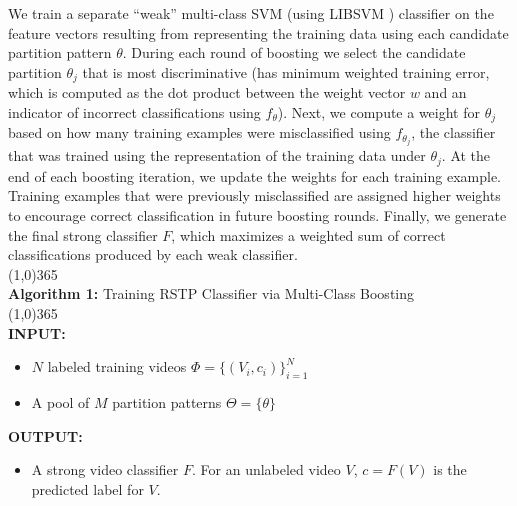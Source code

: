 \documentclass{bmvc2k}
\begin{document}
  We train a separate ``weak''
  multi-class SVM 
  (using LIBSVM \cite{Chang11})
	classifier on the feature vectors resulting from representing the training
	data using each candidate partition pattern $\theta$.   During each round of boosting we select the
	candidate partition $\theta_j$ that is most discriminative (has minimum
  weighted training
	error, which is computed as the dot product between the weight vector $w$
  and an indicator of incorrect classifications using $f_\theta$).
  Next, we compute a weight for $\theta_j$ based on how many training
  examples were misclassified using $f_{\theta_j}$, the classifier
  that was trained using the representation of the training data under
  $\theta_j$.
  At the end of each boosting iteration, we update the weights for each
  training example. Training examples that were previously misclassified are
  assigned higher weights to encourage correct classification in future
  boosting rounds.
  Finally, we generate the 
	final strong classifier $F$, which maximizes a weighted
  sum of correct classifications produced by each weak classifier.\\
  \footnotesize
  \line(1,0){365}\\
	\noindent\textbf{Algorithm 1:} Training RSTP Classifier via Multi-Class Boosting \\
  \line(1,0){365}\\
	\textbf{\scriptsize INPUT:} 
	\begin{itemize}
		\item $N$ labeled training videos $\Phi = \{(V_i, c_i)\}_{i=1}^N$
		\item A pool of $M$ partition patterns $\Theta = \{\theta\}$
	\end{itemize}
	\textbf{\scriptsize OUTPUT:}
	\begin{itemize}
		\item A strong video classifier $F$. For an unlabeled video $V$, 
			$c=F(V)$ is the predicted label for $V$.
	\end{itemize}
\end{document}
